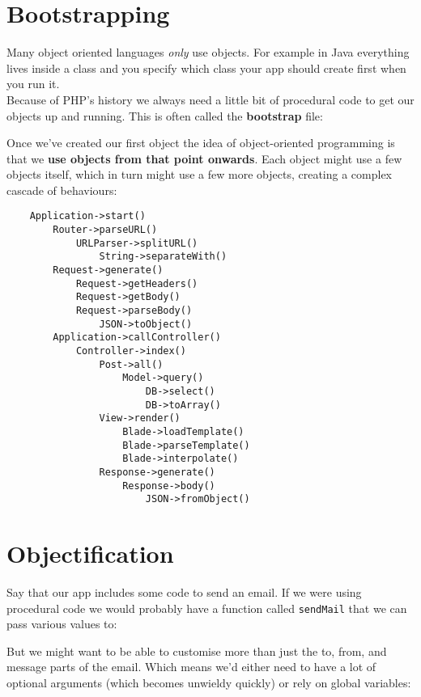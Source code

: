 \section{Bootstrapping}

Many object oriented languages \textit{only} use objects. For example in Java everything lives inside a class and you specify which class your app should create first when you run it.
\\

Because of PHP's history we always need a little bit of procedural code to get our objects up and running. This is often called the \textbf{bootstrap} file:


Once we've created our first object the idea of object-oriented programming is that we \textbf{use objects from that point onwards}. Each object might use a few objects itself, which in turn might use a few more objects, creating a complex cascade of behaviours:

\begin{verbatim}
    Application->start()
        Router->parseURL()
            URLParser->splitURL()
                String->separateWith()
        Request->generate()
            Request->getHeaders()
            Request->getBody()
            Request->parseBody()
                JSON->toObject()
        Application->callController()
            Controller->index()
                Post->all()
                    Model->query()
                        DB->select()
                        DB->toArray()
                View->render()
                    Blade->loadTemplate()
                    Blade->parseTemplate()
                    Blade->interpolate()
                Response->generate()
                    Response->body()
                        JSON->fromObject()
\end{verbatim}

\pagebreak

\section{Objectification}

Say that our app includes some code to send an email. If we were using procedural code we would probably have a function called \texttt{sendMail} that we can pass various values to:


But we might want to be able to customise more than just the to, from, and message parts of the email. Which means we'd either need to have a lot of optional arguments (which becomes unwieldy quickly) or rely on global variables:

